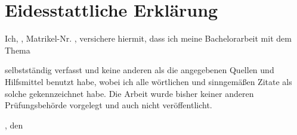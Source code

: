 \thispagestyle{empty}
\section*{Eidesstattliche Erklärung}

Ich, \Name, Matrikel-Nr. \Matr, versichere hiermit, dass ich meine Bachelorarbeit mit dem Thema

\begin{quote} \textit{\Titel}\end{quote}

selbstständig verfasst und keine anderen als die angegebenen Quellen und Hilfsmittel
benutzt habe, wobei ich alle wörtlichen und sinngemäßen Zitate als solche gekennzeichnet habe. Die Arbeit wurde bisher keiner anderen Prüfungsbehörde vorgelegt
und auch nicht veröffentlicht.\vspace{1cm}

\AbgabeOrt, den \DatumAbgabe\vspace{1.5cm}

{\textsc{\Name}}

\newpage
